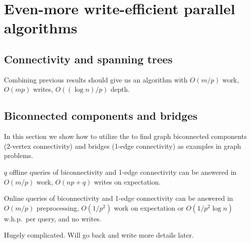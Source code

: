 \section{Even-more write-efficient parallel algorithms}

\subsection{Connectivity and spanning trees}

Combining previous results should give us an algorithm with $O(m/p)$ work, $O(mp)$ writes, $O((\log n)/p)$ depth.

\subsection{Biconnected components and bridges}

In this section we show how to utilize the \implicit{} to find graph biconnected components (2-vertex connectivity) and bridges (1-edge connectivity) as examples in graph problems.




$q$ offline queries of biconnectivity and 1-edge connectivity can be answered in $O(m/p)$ work, $O(np+q)$ writes on expectation.

Online queries of biconnectivity and 1-edge connectivity can be answered in $O(m/p)$ preprocessing, $O(1/p^2)$ work on expectation or $O(1/{p^2\log n})$ w.h.p.\ per query, and no writes.

Hugely complicated.  Will go back and write more details later.
